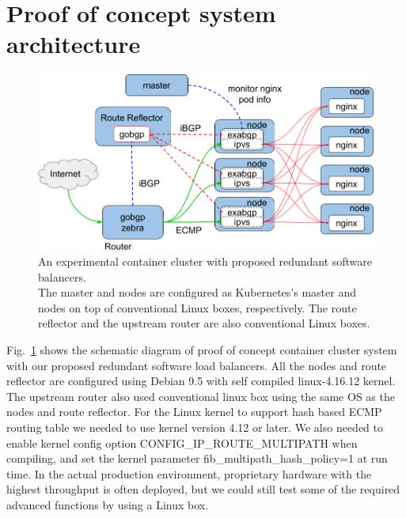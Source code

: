 



\section{Proof of concept system architecture}\label{sec:poc}

\begin{figure}[tb]
\begin{center}
\includegraphics[width=0.8\columnwidth]{Figs/poc.png}
\end{center}
\caption{
  An experimental container cluster with proposed redundant software balancers. \\ %
  The master and nodes are configured as Kubernetes's master and nodes on top of conventional Linux boxes, respectively.
  The route reflector and the upstream router are also conventional Linux boxes.
}
\label{fig:poc}
\end{figure}

Fig.~\ref{fig:poc} shows the schematic diagram of proof of concept container cluster system with our proposed redundant software load balancers.
All the nodes and route reflector are configured using Debian 9.5 with self compiled linux-4.16.12 kernel.  
The upstream router also used conventional linux box using the same OS as the nodes and route reflector.
For the Linux kernel to support hash based ECMP routing table we needed to use kernel version 4.12 or later.
We also needed to enable kernel config option CONFIG\_IP\_ROUTE\_MULTIPATH\cite{ipsysctl} when compiling, and set the kernel parameter fib\_multipath\_hash\_policy=1 at run time.
In the actual production environment, proprietary hardware with the highest throughput is often deployed, but we could still test some of the required advanced functions by using a Linux box.

